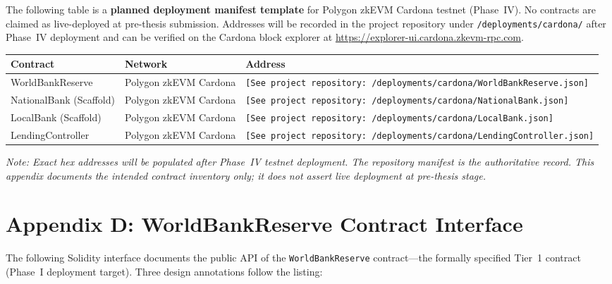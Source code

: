 \documentclass[12pt,a4paper]{report}
\newcommand{\tableheadcolor}{\rowcolor{TableHeadBg}}
\newcommand{\tableheadfont}{\bfseries}
\begin{document}
The following table is a \textbf{planned deployment manifest template} for Polygon zkEVM Cardona testnet (Phase~IV). No contracts are claimed as live-deployed at pre-thesis submission. Addresses will be recorded in the project repository under \texttt{/deployments/cardona/} after Phase~IV deployment and can be verified on the Cardona block explorer at \url{https://explorer-ui.cardona.zkevm-rpc.com}.

\begin{table}[H]
\centering
\begin{tabular}{@{}llp{5.5cm}@{}}
\toprule
\tableheadcolor
\tableheadfont Contract & \tableheadfont Network & \tableheadfont Address \\
\midrule
WorldBankReserve & Polygon zkEVM Cardona & \texttt{[See project repository: /deployments/cardona/WorldBankReserve.json]} \\
\rowcolor{RowShade}
NationalBank (Scaffold) & Polygon zkEVM Cardona & \texttt{[See project repository: /deployments/cardona/NationalBank.json]} \\
LocalBank (Scaffold) & Polygon zkEVM Cardona & \texttt{[See project repository: /deployments/cardona/LocalBank.json]} \\
\rowcolor{RowShade}
LendingController & Polygon zkEVM Cardona & \texttt{[See project repository: /deployments/cardona/LendingController.json]} \\
\bottomrule
\end{tabular}
\end{table}

\noindent\textit{Note: Exact hex addresses will be populated after Phase~IV testnet deployment. The repository manifest is the authoritative record. This appendix documents the intended contract inventory only; it does not assert live deployment at pre-thesis stage.}


\chapter*{Appendix D: WorldBankReserve Contract Interface}
{}

The following Solidity interface documents the public API of the \texttt{WorldBankReserve} contract---the formally specified Tier~1 contract (Phase~I deployment target). Three design annotations follow the listing:
\end{document}
